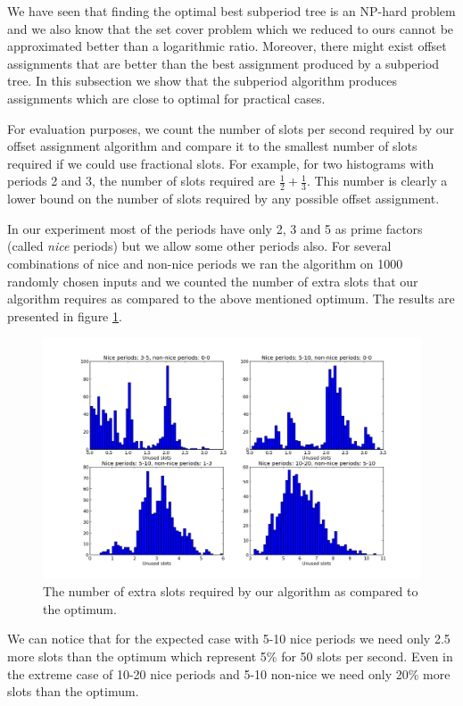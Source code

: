 We have seen that finding the optimal best subperiod tree is an NP-hard problem and we also know that the set cover problem which we reduced to ours cannot be approximated better than a logarithmic ratio. Moreover, there might exist offset assignments that are better than the best assignment produced by a subperiod tree. In this subsection we show that the subperiod algorithm produces assignments which are close to optimal for practical cases. 

For evaluation purposes, we count the number of slots per second required by our offset assignment algorithm and compare it to the smallest number of slots required if we could use fractional slots. For example, for two histograms with periods 2 and 3, the number of slots required are $\frac 1 2 + \frac 1 3$. This number is clearly a lower bound on the number of slots required by any possible offset assignment.

In our experiment most of the periods have only 2, 3 and 5 as prime factors (called \emph{nice} periods) but we allow some other periods also. For several combinations of nice and non-nice periods we ran the algorithm on 1000 randomly chosen inputs and we counted the number of extra slots that our algorithm requires as compared to the above mentioned optimum. The results are presented in figure \ref{fig:unused_slots}.

\begin{figure}[ht]
\centering
\includegraphics[scale=0.45]{Images/unused_slots.png}
\caption{The number of extra slots required by our algorithm as compared to the optimum.}
\label{fig:unused_slots}
\end{figure}

We can notice that for the expected case with 5-10 nice periods we need only 2.5 more slots than the optimum which represent 5\% for 50 slots per second. Even in the extreme case of 10-20 nice periods and 5-10 non-nice we need only 20\% more slots than the optimum.

